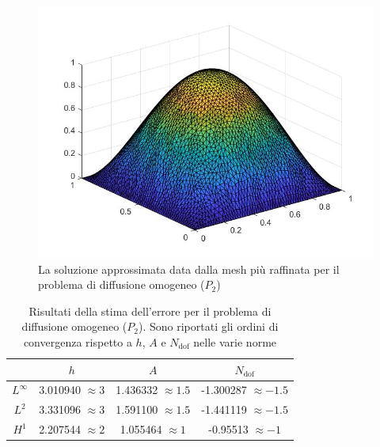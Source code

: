 \documentclass[%
	corpo=11pt,
    twoside,
    stile=classica,
    oldstyle,
    tipotesi=custom,
    greek,
    evenboxes,
]{toptesi}
\begin{document}
\begin{figure}[htbp]
    \centering
    
    \includegraphics[scale=0.4]{Pictures/grafico-p2-omog.jpg}
    \caption{La soluzione approssimata data dalla mesh più raffinata per il problema di diffusione omogeneo ($P_2$)}
    \label{fig:soluzione_p2_omog}
  
\end{figure}



\begin{table}[htbp]
  \centering
  \begin{tabular}{|c|c|c|c|}
    \cline{2-4}
    \multicolumn{1}{c|}{} & $h$ & $A$ & $N_{\text{dof}}$ \\
    \hline
    $L^\infty$ & 3.010940  $\approx 3$ & 1.436332 $\approx 1.5$ & -1.300287 $\approx -1.5$\\
    \hline
    $L^2$ & 3.331096  $\approx 3$ & 1.591100 $\approx 1.5$& -1.441119 $\approx -1.5$\\
    \hline
    $H^1$ & 2.207544  $\approx 2$ & 1.055464 $\approx 1$& -0.95513 $\approx -1$ \\
    \hline
  \end{tabular}
  \caption{Risultati della stima dell'errore per il problema di diffusione omogeneo ($P_2$). Sono riportati gli ordini di convergenza rispetto a $h$, $A$ e $N_{\text{dof}}$ nelle varie norme}
  \label{tab:stima_errore-p2}
\end{table}
\end{document}
